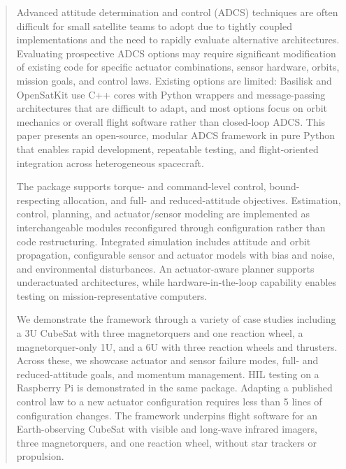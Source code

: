 \documentclass[conference]{IEEEtran}
\begin{document}
\begin{abstract}
Advanced attitude determination and control (ADCS) techniques are often difficult for small satellite teams to adopt due to tightly coupled implementations and the need to rapidly evaluate alternative architectures. Evaluating prospective ADCS options may require significant modification of existing code for specific actuator combinations, sensor hardware, orbits, mission goals, and control laws. Existing options are limited: Basilisk and OpenSatKit use C++ cores with Python wrappers and message-passing architectures that are difficult to adapt, and most options focus on orbit mechanics or overall flight software rather than closed-loop ADCS. This paper presents an open-source, modular ADCS framework in pure Python that enables rapid development, repeatable testing, and flight-oriented integration across heterogeneous spacecraft.

The package supports torque- and command-level control, bound-respecting allocation, and full- and reduced-attitude objectives. Estimation, control, planning, and actuator/sensor modeling are implemented as interchangeable modules reconfigured through configuration rather than code restructuring. Integrated simulation includes attitude and orbit propagation, configurable sensor and actuator models with bias and noise, and environmental disturbances. An actuator-aware planner supports underactuated architectures, while hardware-in-the-loop capability enables testing on mission-representative computers.

We demonstrate the framework through a variety of case studies including a 3U CubeSat with three magnetorquers and one reaction wheel, a magnetorquer-only 1U, and a 6U with three reaction wheels and thrusters. Across these, we showcase actuator and sensor failure modes, full- and reduced-attitude goals, and momentum management. HIL testing on a Raspberry Pi is demonstrated in the same package. Adapting a published control law to a new actuator configuration requires less than 5 lines of configuration changes. The framework underpins flight software for an Earth-observing CubeSat with visible and long-wave infrared imagers, three magnetorquers, and one reaction wheel, without star trackers or propulsion.
\end{abstract}

\end{document}
